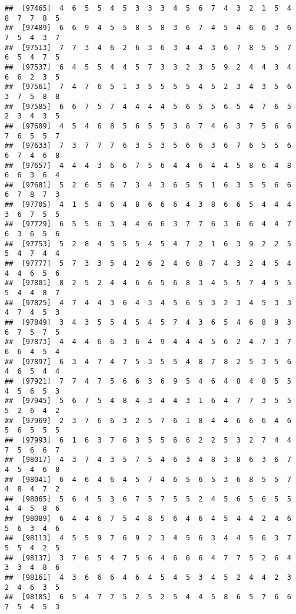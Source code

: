 \documentclass[
]{book}
\begin{document}
\begin{verbatim}
##  [97465]  4  6  5  5  4  5  3  3  3  4  5  6  7  4  3  2  1  5  4  8  7  7  8  5
##  [97489]  6  6  9  4  5  5  8  5  8  3  6  7  4  5  4  6  6  3  6  7  5  4  3  7
##  [97513]  7  7  3  4  6  2  6  3  6  3  4  4  3  6  7  8  5  5  7  6  5  4  7  5
##  [97537]  6  4  5  5  4  4  5  7  3  3  2  3  5  9  2  4  4  3  4  6  6  2  3  5
##  [97561]  7  4  7  6  5  1  3  5  5  5  5  4  5  2  3  4  3  5  6  3  7  5  8  8
##  [97585]  6  6  7  5  7  4  4  4  4  5  6  5  5  6  5  4  7  6  5  2  3  4  3  5
##  [97609]  4  5  4  6  8  5  6  5  5  3  6  7  4  6  3  7  5  6  6  7  6  5  5  7
##  [97633]  7  3  7  7  7  6  3  5  3  5  6  6  3  6  7  6  5  5  6  6  7  4  6  8
##  [97657]  4  4  4  3  6  6  7  5  6  4  4  6  4  4  5  8  6  4  8  6  6  3  6  4
##  [97681]  5  2  6  5  6  7  3  4  3  6  5  5  1  6  3  5  5  6  6  6  7  8  7  3
##  [97705]  4  1  5  4  6  4  8  6  6  6  4  3  8  6  6  5  4  4  4  3  6  7  5  5
##  [97729]  6  5  5  6  3  4  4  6  6  3  7  7  6  3  6  6  4  4  7  6  3  6  5  6
##  [97753]  5  2  8  4  5  5  5  4  5  4  7  2  1  6  3  9  2  2  5  5  4  7  4  4
##  [97777]  5  7  3  3  5  4  2  6  2  4  6  8  7  4  3  2  4  5  4  4  4  6  5  6
##  [97801]  8  2  5  2  4  4  6  6  5  6  8  3  4  5  5  7  4  5  5  5  4  4  8  7
##  [97825]  4  7  4  4  3  6  4  3  4  5  6  5  3  2  3  4  5  3  3  4  7  4  5  3
##  [97849]  3  4  3  5  5  4  5  4  5  7  4  3  6  5  4  6  8  9  3  6  7  5  7  5
##  [97873]  4  4  4  6  6  3  6  4  9  4  4  4  5  6  2  4  7  3  7  6  6  4  5  4
##  [97897]  6  3  4  7  4  7  5  3  5  5  4  8  7  8  2  5  3  5  6  4  6  5  4  4
##  [97921]  7  7  4  7  5  6  6  3  6  9  5  4  6  4  8  4  8  5  5  4  5  6  5  3
##  [97945]  5  6  7  5  4  8  4  3  4  4  3  1  6  4  7  7  3  5  5  5  2  6  4  2
##  [97969]  2  3  7  6  6  3  2  5  7  6  1  8  4  4  6  6  6  4  6  5  6  5  5  5
##  [97993]  6  1  6  3  7  6  3  5  5  6  6  2  2  5  3  2  7  4  4  7  5  6  6  7
##  [98017]  4  3  7  4  3  5  7  5  4  6  3  4  8  3  8  6  3  6  7  4  5  4  6  8
##  [98041]  6  4  6  4  6  4  5  7  4  6  5  6  5  3  6  8  5  5  7  4  8  4  7  2
##  [98065]  5  6  4  5  3  6  7  5  7  5  5  2  4  5  6  5  6  5  5  4  4  5  8  6
##  [98089]  6  4  4  6  7  5  4  8  5  6  4  6  4  5  4  4  2  4  6  5  6  3  4  6
##  [98113]  4  5  5  9  7  6  9  2  3  4  5  6  3  4  4  5  6  3  7  5  5  4  2  5
##  [98137]  3  7  6  5  4  7  5  6  4  6  6  6  4  7  7  5  2  6  4  3  3  4  8  6
##  [98161]  4  3  6  6  6  4  6  4  5  4  5  3  4  5  2  4  4  2  3  2  4  6  3  5
##  [98185]  6  5  4  7  7  5  2  5  2  5  4  4  5  8  6  5  7  6  6  7  5  4  5  3

\end{verbatim}
\end{document}
